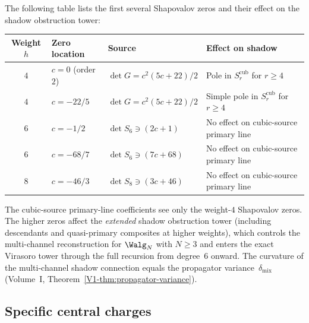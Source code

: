 \begin{computation}
The following table lists the first several Shapovalov
zeros and their effect on the shadow obstruction tower:

\begin{center}
\renewcommand{\arraystretch}{1.4}
\begin{tabular}{clll}
\toprule
Weight $h$ & Zero location & Source & Effect on shadow \\
\midrule
$4$ & $c = 0$ (order $2$) & $\det G = c^2(5c+22)/2$
 & Pole in $S_r^{\mathrm{cub}}$ for $r \geq 4$ \\
$4$ & $c = -22/5$ & $\det G = c^2(5c+22)/2$
 & Simple pole in $S_r^{\mathrm{cub}}$ for $r \geq 4$ \\
$6$ & $c = -1/2$ & $\det S_6 \ni (2c+1)$
 & No effect on cubic-source primary line \\
$6$ & $c = -68/7$ & $\det S_6 \ni (7c+68)$
 & No effect on cubic-source primary line \\
$8$ & $c = -46/3$ & $\det S_8 \ni (3c+46)$
 & No effect on cubic-source primary line \\
\bottomrule
\end{tabular}
\end{center}

\noindent The cubic-source primary-line coefficients see only the
weight-$4$ Shapovalov zeros. The higher zeros affect the
\emph{extended} shadow obstruction tower (including descendants and
quasi-primary composites at higher weights), which controls the
multi-channel reconstruction for $\Walg_N$ with $N \geq 3$ and enters
the exact Virasoro tower through the full recursion from degree~$6$
onward.
The curvature of the multi-channel shadow connection equals
the propagator variance~$\delta_{\mathrm{mix}}$
(Volume~I, Theorem~\ref{V1-thm:propagator-variance}).
\end{computation}


\subsection{Specific central charges}

